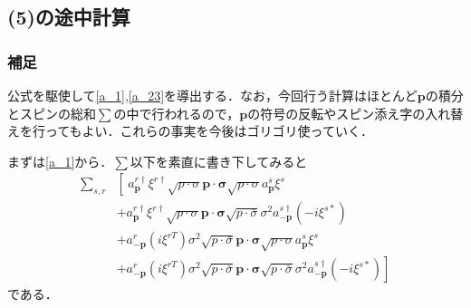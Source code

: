 \documentclass[pdflatex,unicode,ja=standard,12pt]{beamer}
\begin{document}
\subsection{(5)の途中計算}
\label{append_5}

\begin{frame}[noframenumbering]
  
  \frametitle{補足\ \subsecname}
  \thispagestyle{empty}
  
  公式を駆使して\eqref{a_1},\eqref{a_23}を導出する．なお，今回行う計算はほとんど$\mathbf{p}$の積分とスピンの総和$\sum$の中で行われるので，$\mathbf{p}$の符号の反転やスピン添え字の入れ替えを行ってもよい．これらの事実を今後はゴリゴリ使っていく．

  \vspace{10pt}

  まずは\eqref{a_1}から．$\sum$以下を素直に書き下してみると
  \begin{align}
    \sum_{s,r}
    &
    \left[\ 
      a_{\mathbf{p}}^{r\dag}\xi^{r\dag}
      \sqrt{p\cdot\sigma}\mathbf{p}\cdot\bm{\sigma}\sqrt{p\cdot\sigma}
      a_{\mathbf{p}}^s\xi^s
    \right.
    \nonumber
    \\
    &
    +
    a_{\mathbf{p}}^{r\dag}\xi^{r\dag}
    \sqrt{p\cdot\sigma}\mathbf{p}\cdot\bm{\sigma}\sqrt{p\cdot\bar{\sigma}}
    \sigma^2 a_{-\mathbf{p}}^{s\dag}(-i\xi^{s*})
    \nonumber
    \\
    &
    +
    a_{-\mathbf{p}}^{r}(i\xi^{rT})\sigma^2
    \sqrt{p\cdot\bar{\sigma}}\mathbf{p}\cdot\bm{\sigma}\sqrt{p\cdot\sigma}
    a_{\mathbf{p}}^s\xi^s
    \nonumber
    \\
    &
    +
    \left.
      a_{-\mathbf{p}}^{r}(i\xi^{rT})\sigma^2
      \sqrt{p\cdot\bar{\sigma}}\mathbf{p}\cdot\bm{\sigma}\sqrt{p\cdot\bar{\sigma}}
      \sigma^2 a_{-\mathbf{p}}^{s\dag}(-i\xi^{s*})
    \right]
  \end{align}
  である．

\end{frame}
\end{document}
